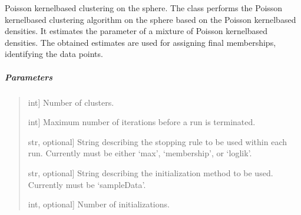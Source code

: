 \documentclass[letterpaper,10pt,english,openany,oneside]{sphinxmanual}
\begin{document}
{{{{\begin{fulllineitems}
\label{\detokenize{api_reference/generated/QuadratiK.spherical_clustering.PKBC:QuadratiK.spherical_clustering.PKBC}}
\pysigstartsignatures
{}
\pysigstopsignatures
\sphinxAtStartPar
Poisson kernel\sphinxhyphen{}based clustering on the sphere.
The class performs the Poisson kernel\sphinxhyphen{}based clustering algorithm
on the sphere based on the Poisson kernel\sphinxhyphen{}based densities. It estimates
the parameter of a mixture of Poisson kernel\sphinxhyphen{}based densities. The obtained
estimates are used for assigning final memberships, identifying the data points.


\subparagraph{Parameters}
\label{\detokenize{api_reference/generated/QuadratiK.spherical_clustering.PKBC:parameters}}\begin{quote}
\begin{description}
\sphinxlineitem{num\_clust}{[}int{]}
\sphinxAtStartPar
Number of clusters.

\sphinxlineitem{max\_iter}{[}int{]}
\sphinxAtStartPar
Maximum number of iterations before a run is terminated.

\sphinxlineitem{stopping\_rule}{[}str, optional{]}
\sphinxAtStartPar
String describing the stopping rule to be used within each run.
Currently must be either ‘max’, ‘membership’, or ‘loglik’.

\sphinxlineitem{init\_method}{[}str, optional{]}
\sphinxAtStartPar
String describing the initialization method to be used.
Currently must be ‘sampleData’.

\sphinxlineitem{num\_init}{[}int, optional{]}
\sphinxAtStartPar
Number of initializations.


\end{description}
\end{quote}
\end{fulllineitems}}}}}
\end{document}
